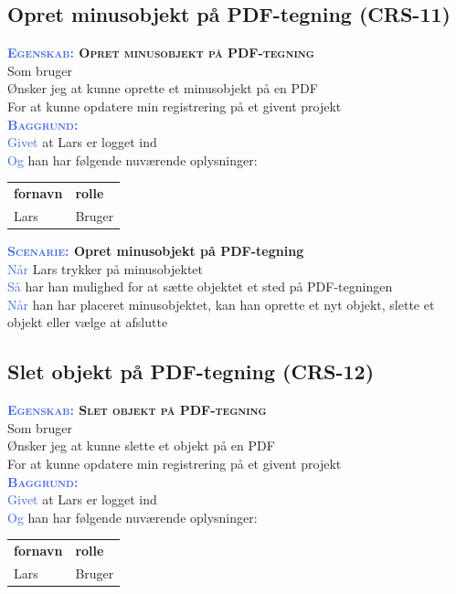 \subsection{Opret minusobjekt på PDF-tegning (CRS-11)} \label{sec:USOpretMinusObjekt}
\textbf{\textsc{\textcolor{RoyalBlue}{Egenskab:} Opret minusobjekt på PDF-tegning}}\\
Som bruger\\
Ønsker jeg at kunne oprette et minusobjekt på en PDF\\
For at kunne opdatere min registrering på et givent projekt \\

\textsc{\textcolor{RoyalBlue}{\textbf{Baggrund:}}}\\
\textcolor{RoyalBlue}{Givet} at Lars er logget ind\\
\textcolor{RoyalBlue}{Og} han har følgende nuværende oplysninger:\\
\begin{tabular}{| l | l |}
	\textbf{fornavn} & \textbf{rolle} \\
	Lars & Bruger\\
\end{tabular}

\textbf{\textsc{\textcolor{RoyalBlue}{Scenarie:}} Opret minusobjekt på PDF-tegning}\\
\textcolor{RoyalBlue}{Når} Lars trykker på minusobjektet\\
\textcolor{RoyalBlue}{Så}  har han mulighed for at sætte objektet et sted på PDF-tegningen \\
\textcolor{RoyalBlue}{Når} han har placeret minusobjektet, kan han oprette et nyt objekt, slette et objekt eller vælge at afslutte \\

\subsection{Slet objekt på PDF-tegning (CRS-12)} \label{sec:USSletObjekt}
\textbf{\textsc{\textcolor{RoyalBlue}{Egenskab:} Slet objekt på PDF-tegning}}\\
Som bruger\\
Ønsker jeg at kunne slette et objekt på en PDF\\
For at kunne opdatere min registrering på et givent projekt \\

\textsc{\textcolor{RoyalBlue}{\textbf{Baggrund:}}}\\
\textcolor{RoyalBlue}{Givet} at Lars er logget ind\\
\textcolor{RoyalBlue}{Og} han har følgende nuværende oplysninger:\\
\begin{tabular}{| l | l |}
	\textbf{fornavn} & \textbf{rolle} \\
	Lars & Bruger\\
\end{tabular}

